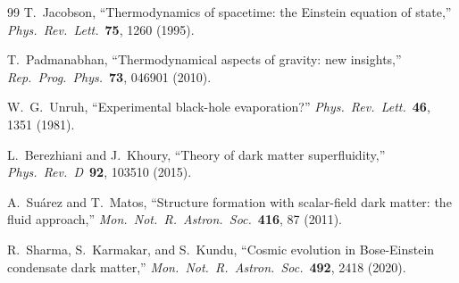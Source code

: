 \documentclass[11pt,a4paper]{article}
\theoremstyle{definition}
\theoremstyle{remark}
\begin{document}
\begin{thebibliography}{99}
T.~Jacobson,
``Thermodynamics of spacetime: the Einstein equation of state,''
\emph{Phys.\ Rev.\ Lett.}\ \textbf{75}, 1260 (1995).

T.~Padmanabhan,
``Thermodynamical aspects of gravity: new insights,''
\emph{Rep.\ Prog.\ Phys.}\ \textbf{73}, 046901 (2010).

W.~G.~Unruh,
``Experimental black-hole evaporation?''
\emph{Phys.\ Rev.\ Lett.}\ \textbf{46}, 1351 (1981).

L.~Berezhiani and J.~Khoury,
``Theory of dark matter superfluidity,''
\emph{Phys.\ Rev.\ D}\ \textbf{92}, 103510 (2015).

A.~Su\'{a}rez and T.~Matos,
``Structure formation with scalar-field dark matter: the fluid approach,''
\emph{Mon.\ Not.\ R.\ Astron.\ Soc.}\ \textbf{416}, 87 (2011).

R.~Sharma, S.~Karmakar, and S.~Kundu,
``Cosmic evolution in Bose-Einstein condensate dark matter,''
\emph{Mon.\ Not.\ R.\ Astron.\ Soc.}\ \textbf{492}, 2418 (2020).

\end{thebibliography}
\end{document}
